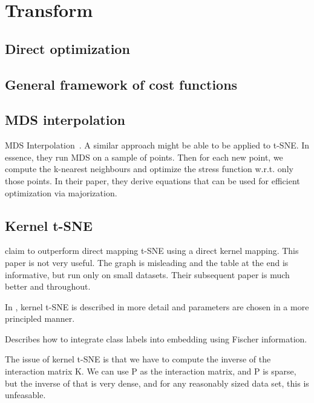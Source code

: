 \documentclass[11pt]{article}
\begin{document}
%
\section{Transform}

\subsection{Direct optimization}

\subsection{General framework of cost functions}
\cite{bunte2012general}

\subsection{MDS interpolation}
MDS Interpolation~\cite{bae2010dimension}. A similar approach might be able to be applied to t-SNE. In essence, they run MDS on a sample of points. Then for each new point, we compute the k-nearest neighbours and optimize the stress function w.r.t. only those points. In their paper, they derive equations that can be used for efficient optimization via majorization.

\subsection{Kernel t-SNE}
\cite{gisbrecht2012out} claim to outperform direct mapping t-SNE using a direct kernel mapping. This paper is not very useful. The graph is misleading and the table at the end is informative, but run only on small datasets. Their subsequent paper is much better and throughout.

In \cite{gisbrecht2015parametric}, kernel t-SNE is described in more detail and parameters are chosen in a more principled manner.

Describes how to integrate class labels into embedding using Fischer information.

The issue of kernel t-SNE is that we have to compute the inverse of the interaction matrix K. We can use P as the interaction matrix, and P is sparse, but the inverse of that is very dense, and for any reasonably sized data set, this is unfeasable.




\end{document}
